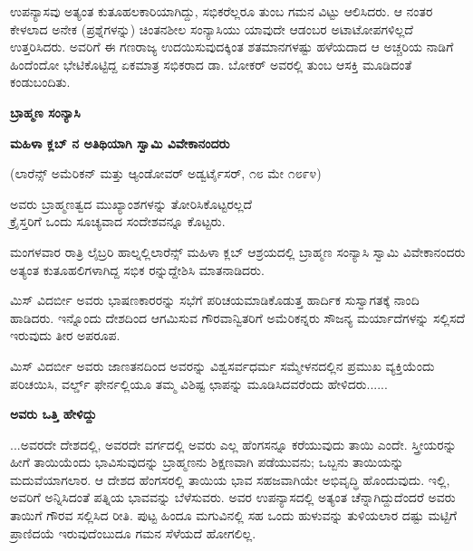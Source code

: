 ಉಪನ್ಯಾಸವು ಅತ್ಯಂತ ಕುತೂಹಲಕಾರಿಯಾಗಿದ್ದು, ಸಭಿಕರೆಲ್ಲರೂ ತುಂಬ ಗಮನ ವಿಟ್ಟು ಆಲಿಸಿದರು. ಆ ನಂತರ ಕೇಳಲಾದ ಅನೇಕ (ಪ್ರಶ್ನೆಗಳನ್ನು) ಚಿಂತನಶೀಲ ಸಂನ್ಯಾಸಿಯು ಯಾವುದೇ ಆಡಂಬರ ಅಟಾಟೋಪಗಳಿಲ್ಲದೆ ಉತ್ತರಿಸಿದರು. ಅವರಿಗೆ ಈ ಗಣರಾಜ್ಯ ಉದಯಿಸುವುದಕ್ಕಿಂತ ಶತಮಾನಗಳಷ್ಟು ಹಳೆಯದಾದ ಆ ಅಚ್ಚರಿಯ ನಾಡಿಗೆ ಹಿಂದೆಂದೋ ಭೇಟಿಕೊಟ್ಟಿದ್ದ ಏಕಮಾತ್ರ ಸಭಿಕರಾದ ಡಾ. ಬೋಕರ್ ಅವರಲ್ಲಿ ತುಂಬ ಆಸಕ್ತಿ ಮೂಡಿದಂತೆ ಕಂಡುಬಂದಿತು.

\begin{center}
\textbf{ಬ್ರಾಹ್ಮಣ ಸಂನ್ಯಾಸಿ}
\end{center}

\begin{center}
\textbf{ಮಹಿಳಾ ಕ್ಲಬ್ ನ ಅತಿಥಿಯಾಗಿ ಸ್ವಾಮಿ ವಿವೇಕಾನಂದರು}
\end{center}

\begin{center}
(ಲಾರೆನ್ಸ್ ಅಮೆರಿಕನ್ ಮತ್ತು ಆ್ಯಂಡೋವರ್ ಅಡ್ವರ್ಟೈಸರ್, ೧೮ ಮೇ ೧೮೯೪)
\end{center}

\begin{center}
ಅವರು ಬ್ರಾಹ್ಮಣತ್ವದ ಮುಖ್ಯಾಂಶಗಳನ್ನು ತೋರಿಸಿಕೊಟ್ಟರಲ್ಲದೆ\\ಕ್ರೈಸ್ತರಿಗೆ ಒಂದು ಸೂಚ್ಯವಾದ ಸಂದೇಶವನ್ನೂ ಕೊಟ್ಟರು.
\end{center}

ಮಂಗಳವಾರ ರಾತ್ರಿ ಲೈಬ್ರರಿ ಹಾಲ್ನಲ್ಲಿಲಾರೆನ್ಸ್ ಮಹಿಳಾ ಕ್ಲಬ್ ಆಶ್ರಯದಲ್ಲಿ ಬ್ರಾಹ್ಮಣ ಸಂನ್ಯಾಸಿ ಸ್ವಾಮಿ ವಿವೇಕಾನಂದರು ಅತ್ಯಂತ ಕುತೂಹಲಿಗಳಾಗಿದ್ದ ಸಭಿಕ ರನ್ನುದ್ದೇಶಿಸಿ ಮಾತನಾಡಿದರು.

ಮಿಸ್ ವಿದರ್ಬೀ ಅವರು ಭಾಷಣಕಾರರನ್ನು ಸಭೆಗೆ ಪರಿಚಯಮಾಡಿಕೊಡುತ್ತ ಹಾರ್ದಿಕ ಸುಸ್ವಾಗತಕ್ಕೆ ನಾಂದಿ ಹಾಡಿದರು. ಇನ್ನೊಂದು ದೇಶದಿಂದ ಆಗಮಿಸುವ ಗೌರವಾನ್ವಿತರಿಗೆ ಅಮೆರಿಕನ್ನರು ಸೌಜನ್ಯ ಮರ್ಯಾದೆಗಳನ್ನು ಸಲ್ಲಿಸದೆ ಇರುವುದು ತೀರ ಅಪರೂಪ.

ಮಿಸ್ ವಿದರ್ಬೀ ಅವರು ಜಾಣತನದಿಂದ ಅವರನ್ನು ವಿಶ್ವಸರ್ವಧರ್ಮ ಸಮ್ಮೇಳನದಲ್ಲಿನ ಪ್ರಮುಖ ವ್ಯಕ್ತಿಯೆಂದು ಪರಿಚಯಿಸಿ, ವರ್ಲ್ಡ್ ಫೇರ್ನಲ್ಲಿಯೂ ತಮ್ಮ ವಿಶಿಷ್ಟ ಛಾಪನ್ನು ಮೂಡಿಸಿದವರೆಂದು ಹೇಳಿದರು......

\begin{center}
\textbf{ಅವರು ಒತ್ತಿ ಹೇಳಿದ್ದು}
\end{center}

...ಅವರದೇ ದೇಶದಲ್ಲಿ, ಅವರದೇ ವರ್ಗದಲ್ಲಿ ಅವರು ಎಲ್ಲ ಹೆಂಗಸನ್ನೂ ಕರೆಯುವುದು ತಾಯಿ ಎಂದೇ. ಸ್ತ್ರೀಯರನ್ನು ಹೀಗೆ ತಾಯಿಯೆಂದು ಭಾವಿಸುವುದನ್ನು ಬ್ರಾಹ್ಮಣನು ಶಿಕ್ಷಣವಾಗಿ ಪಡೆಯುವನು; ಒಬ್ಬನು ತಾಯಿಯನ್ನು ಮದುವೆಯಾಗಲಾರ. ಆ ದೇಶದ ಹೆಂಗಸರಲ್ಲಿ ತಾಯಿಯ ಭಾವ ಸಹಜವಾಗಿಯೇ ಅಭಿವೃದ್ಧಿ ಹೊಂದುವುದು. ಇಲ್ಲಿ, ಅವರಿಗೆ ಅನ್ನಿಸಿದಂತೆ ಪತ್ನಿಯ ಭಾವವನ್ನು ಬೆಳೆಸುವರು. ಅವರ ಉಪನ್ಯಾಸದಲ್ಲಿ ಅತ್ಯಂತ ಚೆನ್ನಾಗಿದ್ದುದೆಂದರೆ ಅವರು ತಾಯಿಗೆ ಗೌರವ ಸಲ್ಲಿಸಿದ ರೀತಿ. ಪುಟ್ಟ ಹಿಂದೂ ಮಗುವಿನಲ್ಲಿ ಸಹ ಒಂದು ಹುಳುವನ್ನು ತುಳಿಯಲಾರ ದಷ್ಟು ಮಟ್ಟಿಗೆ ಪ್ರಾಣಿದಯೆ ಇರುವುದೆಂಬುದೂ ಗಮನ ಸೆಳೆಯದೆ ಹೋಗಲಿಲ್ಲ.

